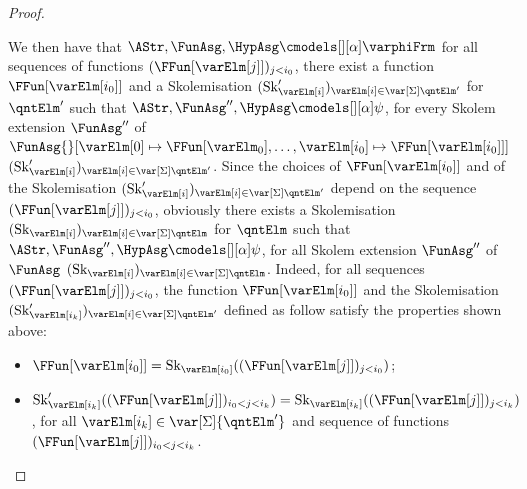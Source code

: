 \documentclass[authoryear]{elsarticle}
\newcommand{\SkolemizedSOF}{\text{Sk}}
\begin{document}
\begin{proof}
\begin{description}
    We then have that $\AStr, \FunAsg, \HypAsg \cmodels[][\alpha] \varphiFrm$
    \iff for all sequences of functions $(\FFun[{\varElm[j]}])_{j < i_0}$, there
    exist a function $\FFun[{\varElm[i_{0}]}]$ and a Skolemisation
    $(\SkolemizedSOF'_{\varElm[i]})_{\varElm[i]\in\var[{\Sigma}]{\qntElm'}}$ for $\qntElm'$
    such that $\AStr, \FunAsg'', \HypAsg \cmodels[][\alpha] \psi$, for every
    Skolem extension $\FunAsg''$ of $\FunAsg{}[{\varElm[0]} \mapsto
      {\FFun[{\varElm_0}]},\ldots, {\varElm[i_0]} \mapsto
      {\FFun[{\varElm[i_0]}]}]$ \wrt
    $(\SkolemizedSOF'_{\varElm[i]})_{\varElm[i]\in\var[{\Sigma}]{\qntElm'}}$.
%
    Since the choices of $\FFun[{\varElm[i_{0}]}]$ and of the Skolemisation
    $(\SkolemizedSOF'_{\varElm[i]})_{\varElm[i]\in\var[{\Sigma}]{\qntElm'}}$ depend on the
    sequence $(\FFun[{\varElm[j]}])_{j < i_0}$, obviously there exists a
    Skolemisation $(\SkolemizedSOF_{\varElm[i]})_{\varElm[i]\in\var[{\Sigma}]{\qntElm}}$
    for $\qntElm$ such that $\AStr, \FunAsg'', \HypAsg \cmodels[][\alpha] \psi$,
    for all Skolem extension $\FunAsg''$ of $\FunAsg$ \wrt
    $(\SkolemizedSOF_{\varElm[i]})_{\varElm[i]\in\var[{\Sigma}]{\qntElm}}$. Indeed, for all
    sequences $(\FFun[{\varElm[j]}])_{j < i_0}$, the function
    $\FFun[{\varElm[i_{0}]}]$ and the Skolemisation
    $(\SkolemizedSOF'_{\varElm[i_k]})_{\varElm[i]\in\var[{\Sigma}]{\qntElm'}}$ defined as
    follow satisfy the properties shown above:
    \begin{itemize}
  \item $\FFun[{\varElm[i_{0}]}] = \SkolemizedSOF_{\varElm[i_0]}((\FFun[{\varElm[j]}])_{j <
    i_0})$;
  \item $\SkolemizedSOF'_{\varElm[i_k]}((\FFun[{\varElm[j]}])_{i_{0} < j < i_k})
    = \SkolemizedSOF_{\varElm[i_k]}((\FFun[{\varElm[j]}])_{j < i_k})$, for all
    $\varElm[i_k] \in \var[\Sigma]{\qntElm'}$ and sequence of functions
    $(\FFun[{\varElm[j]}])_{i_{0} < j < i_k}$.
    \end{itemize}
  \end{description}
  \vspace{-1em}
\end{proof}
\end{document}

